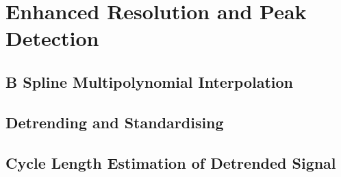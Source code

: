 \documentclass[../../CompleteThesis/Complete_1stDraft]{subfiles}
\begin{document}
\section[Peak Detection][Peak Detection]{Enhanced Resolution and Peak Detection}
\subsection[Interpolation][Interpolation]{B Spline Multipolynomial Interpolation}
\subsection[Standardisation]{Detrending and Standardising}
\subsection[Cycle Length Estimation][Cycle Length Estimation]{Cycle Length Estimation of Detrended Signal}

	
	
\end{document}
